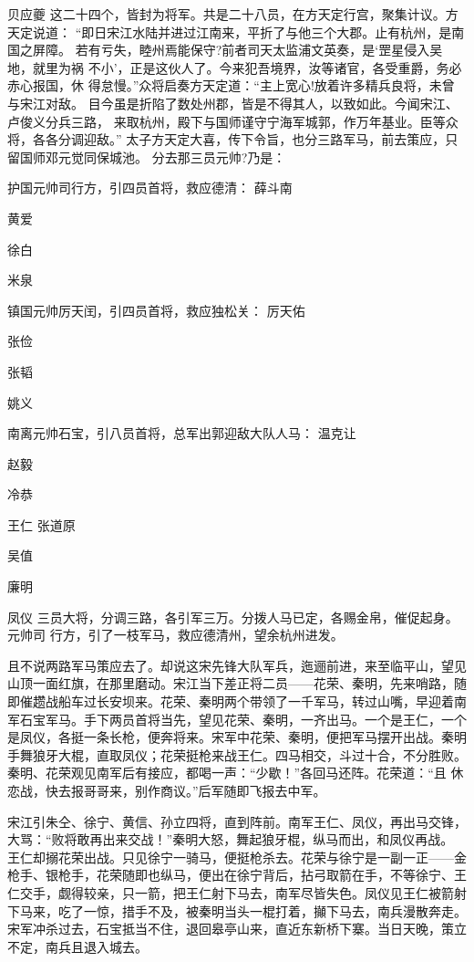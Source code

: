 贝应夔
这二十四个，皆封为将军。共是二十八员，在方天定行宫，聚集计议。方天定说道：
“即日宋江水陆并进过江南来，平折了与他三个大郡。止有杭州，是南国之屏障。
若有亏失，睦州焉能保守?前者司天太监浦文英奏，是‘罡星侵入吴地，就里为祸
不小’，正是这伙人了。今来犯吾境界，汝等诸官，各受重爵，务必赤心报国，休
得怠慢。”众将启奏方天定道：“主上宽心!放着许多精兵良将，未曾与宋江对敌。
目今虽是折陷了数处州郡，皆是不得其人，以致如此。今闻宋江、卢俊义分兵三路，
来取杭州，殿下与国师谨守宁海军城郭，作万年基业。臣等众将，各各分调迎敌。”
太子方天定大喜，传下令旨，也分三路军马，前去策应，只留国师邓元觉同保城池。
分去那三员元帅?乃是：

护国元帅司行方，引四员首将，救应德清：
薛斗南

黄爱

徐白

米泉

镇国元帅厉天闰，引四员首将，救应独松关：
厉天佑

张俭

张韬

姚义

南离元帅石宝，引八员首将，总军出郭迎敌大队人马：
温克让

赵毅

冷恭

王仁
张道原

吴值

廉明

凤仪
三员大将，分调三路，各引军三万。分拨人马已定，各赐金帛，催促起身。元帅司
行方，引了一枝军马，救应德清州，望余杭州进发。

且不说两路军马策应去了。却说这宋先锋大队军兵，迤逦前进，来至临平山，望见
山顶一面红旗，在那里磨动。宋江当下差正将二员——花荣、秦明，先来哨路，随
即催趱战船车过长安坝来。花荣、秦明两个带领了一千军马，转过山嘴，早迎着南
军石宝军马。手下两员首将当先，望见花荣、秦明，一齐出马。一个是王仁，一个
是凤仪，各挺一条长枪，便奔将来。宋军中花荣、秦明，便把军马摆开出战。秦明
手舞狼牙大棍，直取凤仪；花荣挺枪来战王仁。四马相交，斗过十合，不分胜败。
秦明、花荣观见南军后有接应，都喝一声：“少歇！”各回马还阵。花荣道：“且
休恋战，快去报哥哥来，别作商议。”后军随即飞报去中军。

宋江引朱仝、徐宁、黄信、孙立四将，直到阵前。南军王仁、凤仪，再出马交锋，
大骂：“败将敢再出来交战！”秦明大怒，舞起狼牙棍，纵马而出，和凤仪再战。
王仁却搦花荣出战。只见徐宁一骑马，便挺枪杀去。花荣与徐宁是一副一正——金
枪手、银枪手，花荣随即也纵马，便出在徐宁背后，拈弓取箭在手，不等徐宁、王
仁交手，觑得较亲，只一箭，把王仁射下马去，南军尽皆失色。凤仪见王仁被箭射
下马来，吃了一惊，措手不及，被秦明当头一棍打着，攧下马去，南兵漫散奔走。
宋军冲杀过去，石宝抵当不住，退回皋亭山来，直近东新桥下寨。当日天晚，策立
不定，南兵且退入城去。

